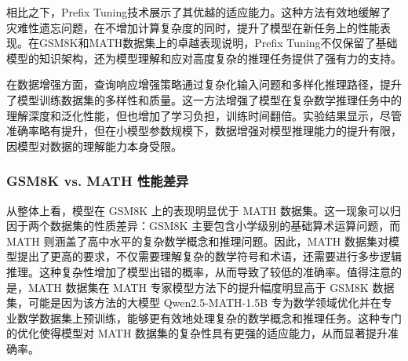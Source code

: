 相比之下，Prefix Tuning技术展示了其优越的适应能力。这种方法有效地缓解了灾难性遗忘问题，在不增加计算复杂度的同时，提升了模型在新任务上的性能表现。在GSM8K和MATH数据集上的卓越表现说明，Prefix Tuning不仅保留了基础模型的知识架构，还为模型理解和应对高度复杂的推理任务提供了强有力的支持。

在数据增强方面，查询响应增强策略通过复杂化输入问题和多样化推理路径，提升了模型训练数据集的多样性和质量。这一方法增强了模型在复杂数学推理任务中的理解深度和泛化性能，但也增加了学习负担，训练时间翻倍。实验结果显示，尽管准确率略有提升，但在小模型参数规模下，数据增强对模型推理能力的提升有限，因模型对数据的理解能力本身受限。

\subsubsection{GSM8K vs. MATH 性能差异} 
从整体上看，模型在 GSM8K 上的表现明显优于 MATH 数据集。这一现象可以归因于两个数据集的性质差异：GSM8K 主要包含小学级别的基础算术运算问题，而 MATH 则涵盖了高中水平的复杂数学概念和推理问题。因此，MATH 数据集对模型提出了更高的要求，不仅需要理解复杂的数学符号和术语，还需要进行多步逻辑推理。这种复杂性增加了模型出错的概率，从而导致了较低的准确率。值得注意的是，MATH 数据集在 MATH 专家模型方法下的提升幅度明显高于 GSM8K 数据集，可能是因为该方法的大模型 Qwen2.5-MATH-1.5B 专为数学领域优化并在专业数学数据集上预训练，能够更有效地处理复杂的数学概念和推理任务。这种专门的优化使得模型对 MATH 数据集的复杂性具有更强的适应能力，从而显著提升准确率。
